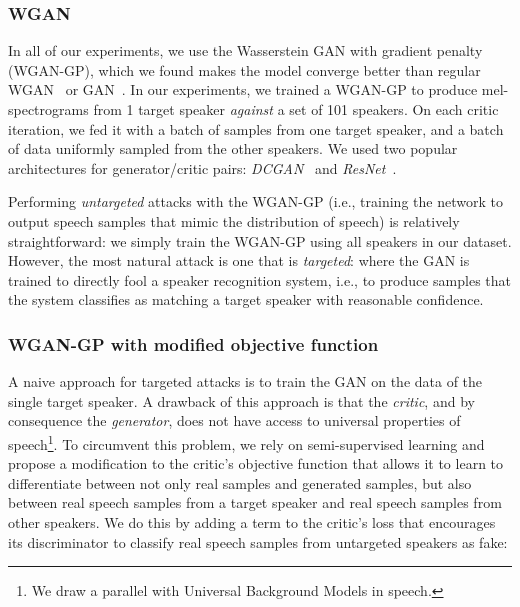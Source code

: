 \subsubsection{WGAN}
In all of our experiments, we use the Wasserstein GAN with gradient penalty
(WGAN-GP), which we found makes the model converge better than regular
WGAN~\cite{arjovsky2017wasserstein} or GAN~\cite{goodfellow2014generative}. 
In our experiments, we trained a WGAN-GP to produce mel-spectrograms from 1
target speaker \textit{against} a set of 101 speakers. On each critic iteration, we fed
it with a batch of samples from one target speaker, and a batch of data
uniformly sampled from the other speakers. We used two popular architectures
for generator/critic pairs: \textit{DCGAN}~\cite{radford2015unsupervised} and
\textit{ResNet}~\cite{ledig2016photo}. 

Performing \textit{untargeted} attacks with the WGAN-GP (i.e., training the
network to output speech samples that mimic the distribution of speech) is
relatively straightforward: we simply train the WGAN-GP using all speakers in
our dataset. However, the most natural attack is one that is \textit{targeted}:
where the GAN is trained to directly fool a speaker recognition system, i.e., to
produce samples that the system classifies as matching a target speaker with
reasonable confidence.

\subsubsection{WGAN-GP with modified objective function}
A naive approach for targeted attacks is to train the GAN on the data of the
single target speaker. A drawback of this approach is that the \textit{critic},
and by consequence the \textit{generator}, does not have access to universal
properties of speech\footnote{We draw a parallel with Universal Background
Models in speech.}. To circumvent this problem, we rely on semi-supervised
learning and propose a modification to the critic's objective function that
allows it to learn to differentiate between not only real samples and generated
samples, but also between real speech samples from a target speaker and real
speech samples from other speakers. We do this by adding a term to the critic's
loss that encourages its discriminator to classify real speech samples from
untargeted speakers as fake: 
\normalsize

